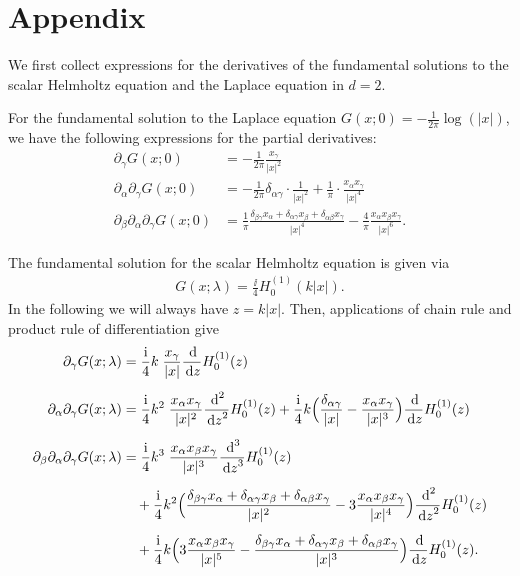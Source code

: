 \chapter*{Appendix}
\label{chap:app}
We first collect expressions for the derivatives of the fundamental solutions to the scalar Helmholtz equation and the Laplace equation in $d= 2$.

For the fundamental solution to the Laplace equation $G(x; 0) = -\frac{1}{2\pi} \log(|x|)$, we have the following expressions for the partial derivatives:
\begin{align*}
  \partial_\gamma G(x; 0) &= -\frac{1}{2\pi} \frac{x_\gamma}{|x|^2} \\[0.5em]
  \partial_\alpha \partial_\gamma G(x; 0) &= -\frac{1}{2\pi} \delta_{\alpha\gamma} \cdot \frac{1}{|x|^2} + \frac{1}{\pi} \cdot \frac{x_\alpha x_\gamma}{|x|^4} \\[0.5em]
  \partial_\beta \partial_\alpha \partial_\gamma G(x; 0)
  &= \frac{1}{\pi} \frac{\delta_{\beta \gamma} x_\alpha + \delta_{\alpha \gamma} x_\beta + \delta_{\alpha\beta} x_\gamma}{|x|^4} - \frac{4}{\pi} \frac{x_\alpha x_\beta x_\gamma}{|x|^6}.
\end{align*}

The fundamental solution  for the scalar Helmholtz equation is given via 
\begin{align*}
  G(x; \lambda) = \frac{\ii}{4} H_0^{(1)}(k|x|).
\end{align*}
In the following we will always have $z =  k|x|$.  
Then, applications of chain rule and product rule of differentiation give
\begin{align*}
  \partial_\gamma G(x; \lambda) &= \frac{\ii}{4} k\;  \frac{x_\gamma}{|x|} \frac{\d{}}{\d z} H_0^{(1)}(z) \\[0.5em]
  \partial_\alpha \partial_\gamma G(x; \lambda) 
  &= \frac{\ii}{4} k^2 \;  \frac{x_\alpha x_\gamma}{|x|^2} \frac{\d{}^2}{\d z^2} H_0^{(1)}(z) + \frac{\ii}{4} k \Big(\frac{\delta_{\alpha\gamma}}{|x|} - \frac{x_\alpha x_\gamma}{|x|^3} \Big) \frac{\d{}}{\d z} H_0^{(1)}(z) \\[0.5em]
  \partial_\beta \partial_\alpha \partial_\gamma G(x; \lambda)
  &= \frac{\ii}{4} k^3 \; \frac{x_\alpha x_\beta x_\gamma}{|x|^3} \frac{\d{}^3}{\d z^3} H_0^{(1)}(z) \\[0.5em]
  &\quad + \frac{\ii}{4} k^2 \Big(\frac{\delta_{\beta\gamma} x_\alpha + \delta_{\alpha \gamma} x_\beta + \delta_{\alpha \beta} x_\gamma}{|x|^2} - 3 \frac{x_\alpha x_\beta x_\gamma}{|x|^4} \Big) \frac{\d{}^2}{\d z^2} H_0^{(1)}(z) \\[0.5em]
  &\quad + \frac{\ii}{4} k \Big( 3 \frac{x_\alpha x_\beta x_\gamma}{|x|^5} - \frac{\delta_{\beta\gamma} x_\alpha + \delta_{\alpha\gamma} x_\beta + \delta_{\alpha\beta} x_\gamma}{|x|^3} \Big) \frac{\d{}}{\d z} H_0^{(1)}(z).
\end{align*}

